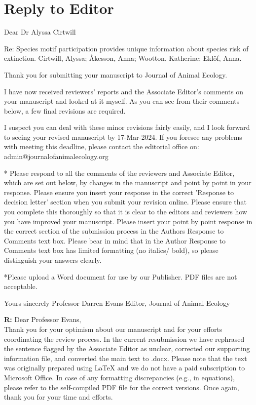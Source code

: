 \documentclass[12pt]{article}
\newenvironment{refquote}{\bigskip \begin{it}}{\end{it}\medskip}
\begin{document}

\section*{Reply to Editor}

    \begin{refquote}

    Dear Dr Alyssa Cirtwill

    Re: Species motif participation provides unique information about species risk of extinction.  Cirtwill, Alyssa; Åkesson, Anna; Wootton, Katherine; Eklöf, Anna.

    Thank you for submitting your manuscript to Journal of Animal Ecology.

    I have now received reviewers' reports and the Associate Editor's comments on your manuscript and looked at it myself. As you can see from their comments below, a few final revisions are required.

    I suspect you can deal with these minor revisions fairly easily, and I look forward to seeing your revised manuscript by 17-Mar-2024. If you foresee any problems with meeting this deadline, please contact the editorial office on: admin@journalofanimalecology.org

    * Please respond to all the comments of the reviewers and Associate Editor, which are set out below, by changes in the manuscript and point by point in your response.  Please ensure you insert your response in the correct 'Response to decision letter' section when you submit your revision online. Please ensure that you complete this thoroughly so that it is clear to the editors and reviewers how you have improved your manuscript. Please insert your point by point response in the correct section of the submission process in the Authors Response to Comments text box.  Please bear in mind that in the Author Response to Comments text box has limited formatting (no italics/ bold), so please distinguish your answers clearly.

    *Please upload a Word document for use by our Publisher. PDF files are not acceptable.


    Yours sincerely
    Professor Darren Evans
    Editor, Journal of Animal Ecology

    \end{refquote}

    \textbf{R:} Dear Professor Evans,\\

    Thank you for your optimism about our manuscript and for your efforts coordinating the review process. In the current resubmission we have rephrased the sentence flagged by the Associate Editor as unclear, corrected our supporting information file, and converted the main text to .docx. Please note that the text was originally prepared using LaTeX and we do not have a paid subscription to Microsoft Office. In case of any formatting discrepancies (e.g., in equations), please refer to the self-compiled PDF file for the correct versions. Once again, thank you for your time and efforts.
\end{document}
